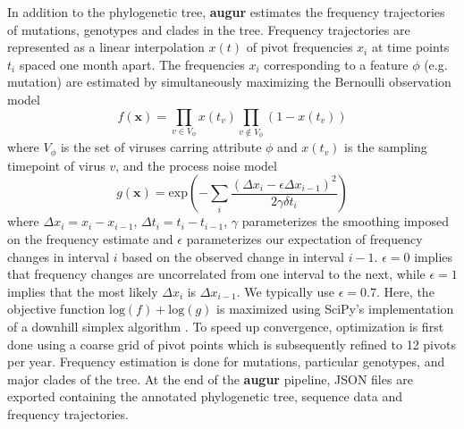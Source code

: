 \documentclass{bioinfo}
\newcommand{\augur}{\textbf{augur}}
\begin{document}
In addition to the phylogenetic tree, \augur{} estimates the frequency trajectories of mutations, genotypes and clades in the tree. 
Frequency trajectories are represented as a linear interpolation $x(t)$ of pivot frequencies $x_i$ at time points $t_i$ spaced one month apart. 
The frequencies $x_i$ corresponding to a feature $\phi$ (e.g. mutation) are estimated by simultaneously maximizing the Bernoulli observation model 
\begin{equation}
	\label{eq:obs}
	f(\mathbf{x}) = \prod_{v\in V_\phi} x(t_v) \prod_{v\notin V_{\phi}} (1-x(t_v))
\end{equation}
where $V_{\phi}$ is the set of viruses carring attribute $\phi$ and $x(t_v)$ is the sampling timepoint of virus $v$, and the process noise model
\begin{equation}
	\label{eq:freq}
	g(\mathbf{x}) = \mathrm{exp}\left(
		-\sum_i \frac{(\Delta x_i - \epsilon\Delta x_{i-1})^2}{2\gamma \delta t_i}
	\right)
\end{equation}
where $\Delta x_i = x_i-x_{i-1}$, $\Delta t_i = t_i-t_{i-1}$, $\gamma$ parameterizes the smoothing imposed on the frequency estimate and $\epsilon$ parameterizes our expectation of frequency changes in interval $i$ based on the observed change in interval $i-1$.
$\epsilon=0$ implies that frequency changes are uncorrelated from one interval to the next, while $\epsilon=1$ implies that the most likely $\Delta x_i$ is $\Delta x_{i-1}$.
We typically use $\epsilon = 0.7$.
Here, the objective function $\mathrm{log}(f) + \mathrm{log}(g)$ is maximized using SciPy's implementation of a downhill simplex algorithm \citep{oliphant_python_2007}.
To speed up convergence, optimization is first done using a coarse grid of pivot points which is subsequently refined to 12 pivots per year. Frequency estimation is done for mutations, particular genotypes, and major clades of the tree.
At the end of the \augur{} pipeline, JSON files are exported containing the annotated phylogenetic tree, sequence data and frequency trajectories.
\end{document}
